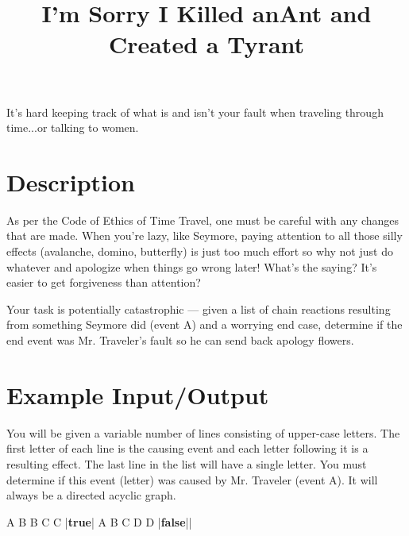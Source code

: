 \documentclass{../codeproblem}
\begin{document}
\title{I'm Sorry I Killed an}
\vspace{-3em}
\title{Ant and Created a Tyrant}

\begin{flavor}
  It's hard keeping track of what is and isn't your fault when
  traveling through time...or talking to women.
\end{flavor}

\section*{Description}
As per the Code of Ethics of Time Travel, one must be careful with any
changes that are made. When you're lazy, like Seymore, paying
attention to all those silly effects (avalanche, domino, butterfly) is
just too much effort so why not just do whatever and apologize when
things go wrong later! What's the saying? It's easier to get
forgiveness than attention?

Your task is potentially catastrophic --- given a list of chain reactions resulting
from something Seymore did (event A) and a worrying end case,
determine if the end event was Mr. Traveler's fault so he can send
back apology flowers.

\section*{Example Input/Output}
You will be given a variable number of lines consisting of upper-case
letters. The first letter of each line is the causing event and each
letter following it is a resulting effect. The last line in the
list will have a single letter. You must determine if this event
(letter) was caused by Mr. Traveler (event A). It will always be a
directed acyclic graph.

\begin{example}
A B 
B C
C
|\textbf{true}|
A B
C D
D
|\textbf{false}||\end{example}
\end{document}
